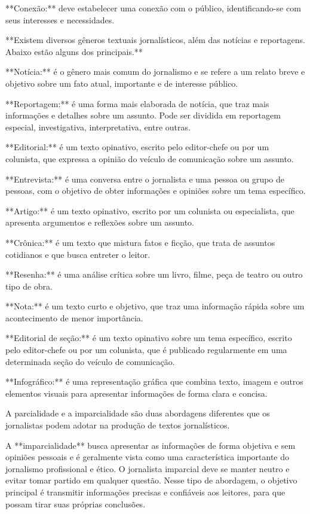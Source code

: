 {{**Conexão:** deve estabelecer uma conexão com o público,
identificando-se com seus interesses e necessidades.

**Existem diversos gêneros textuais jornalísticos, além das notícias e reportagens. Abaixo estão alguns dos principais.**

**Notícia:** é o gênero mais comum do jornalismo e se refere a um relato
breve e objetivo sobre um fato atual, importante e de interesse público.

**Reportagem:** é uma forma mais elaborada de notícia, que traz mais
informações e detalhes sobre um assunto. Pode ser dividida em reportagem
especial, investigativa, interpretativa, entre outras.

**Editorial:** é um texto opinativo, escrito pelo editor-chefe ou por um
colunista, que expressa a opinião do veículo de comunicação sobre um
assunto.

**Entrevista:** é uma conversa entre o jornalista e uma pessoa ou grupo
de pessoas, com o objetivo de obter informações e opiniões sobre um tema
específico.

**Artigo:** é um texto opinativo, escrito por um colunista ou
especialista, que apresenta argumentos e reflexões sobre um assunto.

**Crônica:** é um texto que mistura fatos e ficção, que trata de
assuntos cotidianos e que busca entreter o leitor.

**Resenha:** é uma análise crítica sobre um livro, filme, peça de teatro
ou outro tipo de obra.

**Nota:** é um texto curto e objetivo, que traz uma informação rápida
sobre um acontecimento de menor importância.

**Editorial de seção:** é um texto opinativo sobre um tema específico,
escrito pelo editor-chefe ou por um colunista, que é publicado
regularmente em uma determinada seção do veículo de comunicação.

**Infográfico:** é uma representação gráfica que combina texto, imagem e
outros elementos visuais para apresentar informações de forma clara e
concisa.

A parcialidade e a imparcialidade são duas abordagens diferentes que os
jornalistas podem adotar na produção de textos jornalísticos.

A **imparcialidade** busca apresentar as informações de forma objetiva e
sem opiniões pessoais e é geralmente vista como uma característica
importante do jornalismo profissional e ético. O jornalista imparcial
deve se manter neutro e evitar tomar partido em qualquer questão. Nesse
tipo de abordagem, o objetivo principal é transmitir informações
precisas e confiáveis aos leitores, para que possam tirar suas próprias
conclusões.

}}
